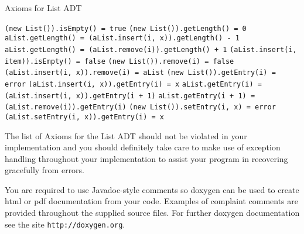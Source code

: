 \documentclass[10pt,letterpaper]{article}
\newcounter{x}\setcounter{x}{1}
\newenvironment{axiom}
  {\renewcommand\theinneraxiom{\arabic{x}}\inneraxiom\stepcounter{x}}
  {\endinneraxiom}
\begin{document}
\begin{table}
	\caption{Axioms for List ADT} \label{axiom:adtlist}
	\begin{axiom} \lstinline|(new List()).isEmpty() = true| \end{axiom}
	\begin{axiom} \lstinline|(new List()).getLength() = 0| \end{axiom}
	\begin{axiom} \lstinline|aList.getLength() = (aList.insert(i, x)).getLength() - 1| \end{axiom}
	\begin{axiom} \lstinline|aList.getLength() = (aList.remove(i)).getLength() + 1| \end{axiom}
	\begin{axiom} \lstinline|(aList.insert(i, item)).isEmpty() = false| \end{axiom}
	\begin{axiom} \lstinline|(new List()).remove(i) = false| \end{axiom}
	\begin{axiom} \lstinline|(aList.insert(i, x)).remove(i) = aList| \end{axiom}
	\begin{axiom} \lstinline|(new List()).getEntry(i) = error| \end{axiom}
	\begin{axiom} \lstinline|(aList.insert(i, x)).getEntry(i) = x| \end{axiom}
	\begin{axiom} \lstinline|aList.getEntry(i) = (aList.insert(i, x)).getEntry(i + 1)| \end{axiom}
	\begin{axiom} \lstinline|aList.getEntry(i + 1) = (aList.remove(i)).getEntry(i)| \end{axiom}
	\begin{axiom} \lstinline|(new List()).setEntry(i, x) = error| \end{axiom}
	\begin{axiom} \lstinline|(aList.setEntry(i, x)).getEntry(i) = x| \end{axiom}
\end{table}

The list of Axioms for the List ADT should not be violated in your implementation and you should definitely take care to make use of exception handling throughout your implementation to assist your program in recovering gracefully from errors. 

You are required to use Javadoc-style comments so doxygen can be used to create html or pdf documentation from your code. Examples of complaint comments are provided throughout the supplied source files. For further doxygen documentation see the site \verb|http://doxygen.org|. 
\end{document}
